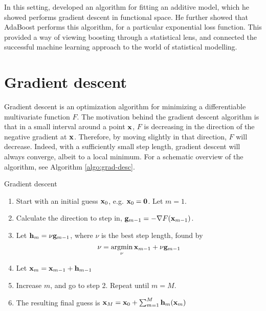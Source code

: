 In this setting, \citet{friedman2000} developed an algorithm for fitting an additive model, which he showed performs gradient descent in functional space. He further showed that AdaBoost performs this algorithm, for a particular exponential loss function. This provided a way of viewing boosting through a statistical lens, and connected the successful machine learning approach to the world of statistical modelling.

\section{Gradient descent}
Gradient descent is an optimization algorithm for minimizing a differentiable multivariate function $F$. The motivation behind the gradient descent algorithm is that in a small interval around a point $\mathbf{x}$, $F$ is decreasing in the direction of the negative gradient at $\mathbf{x}$. Therefore, by moving slightly in that direction, $F$ will decrease. Indeed, with a sufficiently small step length, gradient descent will always converge, albeit to a local minimum. For a schematic overview of the algorithm, see Algorithm \ref{algo:grad-desc}.
\begin{algorithm}
\caption{Gradient descent}
\label{algo:grad-desc}
\begin{enumerate}
    \item Start with an initial guess $\mathbf{x}_0$, e.g. $\mathbf{x}_0=\mathbf{0}$. Let $m=1$.
    \item Calculate the direction to step in, $\mathbf{g}_{m-1}=-\nabla F(\mathbf{x}_{m-1})$.
    \item Let $\mathbf{h}_m=\nu \mathbf{g}_{m-1}$, where $\nu$ is the best step length, found by
        \begin{equation*}
            \nu=\operatorname*{argmin}_{\nu}\mathbf{x}_{m-1}+\nu \mathbf{g}_{m-1}
        \end{equation*}
    \item Let $\mathbf{x}_m=\mathbf{x}_{m-1}+\mathbf{h}_{m-1}$
    \item Increase $m$, and go to step 2. Repeat until $m=M$.
    \item The resulting final guess is $\mathbf{x}_M=\mathbf{x}_0+\sum_{m=1}^M\mathbf{h}_m(\mathbf{x}_m)$
\end{enumerate}
\end{algorithm}

